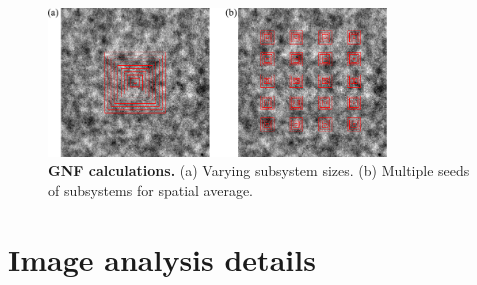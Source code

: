 \documentclass[twocolumn,aps,prx,amsmath,amssymb,longbibliography]{revtex4-2}
\begin{document}
\begin{figure}[!]
\begin{center}
\includegraphics[width=0.8\textwidth]{figures/GNF-calculation/v1.pdf}
\caption[GNF calculations]
{
\textbf{GNF calculations.}
(a) Varying subsystem sizes.
(b) Multiple seeds of subsystems for spatial average.
}
\label{GNF-calculation}
\end{center}
\end{figure}


\section{Image analysis details}
\end{document}
